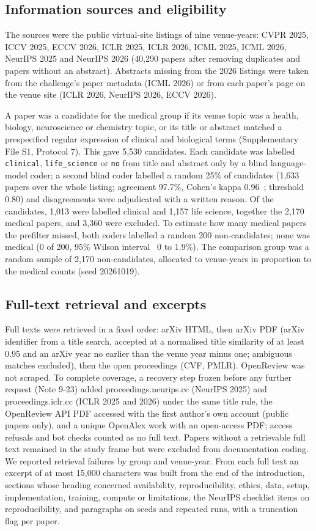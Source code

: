 \documentclass[11pt]{article}
\begin{document}
\subsection*{Information sources and eligibility}
The sources were the public virtual-site listings of nine venue-years: CVPR 2025, ICCV 2025, ECCV 2026, ICLR 2025, ICLR 2026, ICML 2025, ICML 2026, NeurIPS 2025 and NeurIPS 2026 (40,290 papers after removing duplicates and papers without an abstract). Abstracts missing from the 2026 listings were taken from the challenge's paper metadata (ICML 2026) or from each paper's page on the venue site (ICLR 2026, NeurIPS 2026, ECCV 2026).

A paper was a candidate for the medical group if its venue topic was a health, biology, neuroscience or chemistry topic, or its title or abstract matched a prespecified regular expression of clinical and biological terms (Supplementary File S1, Protocol 7). This gave 5,530 candidates. Each candidate was labelled \texttt{clinical}, \texttt{life\_science} or \texttt{no} from title and abstract only by a blind language-model coder; a second blind coder labelled a random 25\% of candidates (1,633 papers over the whole listing; agreement 97.7\%, Cohen's kappa 0.96~\cite{r11}; threshold 0.80) and disagreements were adjudicated with a written reason. Of the candidates, 1,013 were labelled clinical and 1,157 life science, together the 2,170 medical papers, and 3,360 were excluded. To estimate how many medical papers the prefilter missed, both coders labelled a random 200 non-candidates; none was medical (0 of 200, 95\% Wilson interval~\cite{r12} 0 to 1.9\%). The comparison group was a random sample of 2,170 non-candidates, allocated to venue-years in proportion to the medical counts (seed 20261019).

\subsection*{Full-text retrieval and excerpts}
Full texts were retrieved in a fixed order: arXiv HTML, then arXiv PDF (arXiv identifier from a title search, accepted at a normalised title similarity of at least 0.95 and an arXiv year no earlier than the venue year minus one; ambiguous matches excluded), then the open proceedings (CVF, PMLR). OpenReview was not scraped. To complete coverage, a recovery step frozen before any further request (Note 9-23) added proceedings.neurips.cc (NeurIPS 2025) and proceedings.iclr.cc (ICLR 2025 and 2026) under the same title rule, the OpenReview API PDF accessed with the first author's own account (public papers only), and a unique OpenAlex work with an open-access PDF; access refusals and bot checks counted as no full text. Papers without a retrievable full text remained in the study frame but were excluded from documentation coding. We reported retrieval failures by group and venue-year. From each full text an excerpt of at most 15,000 characters was built from the end of the introduction, sections whose heading concerned availability, reproducibility, ethics, data, setup, implementation, training, compute or limitations, the NeurIPS checklist items on reproducibility, and paragraphs on seeds and repeated runs, with a truncation flag per paper.
\end{document}
